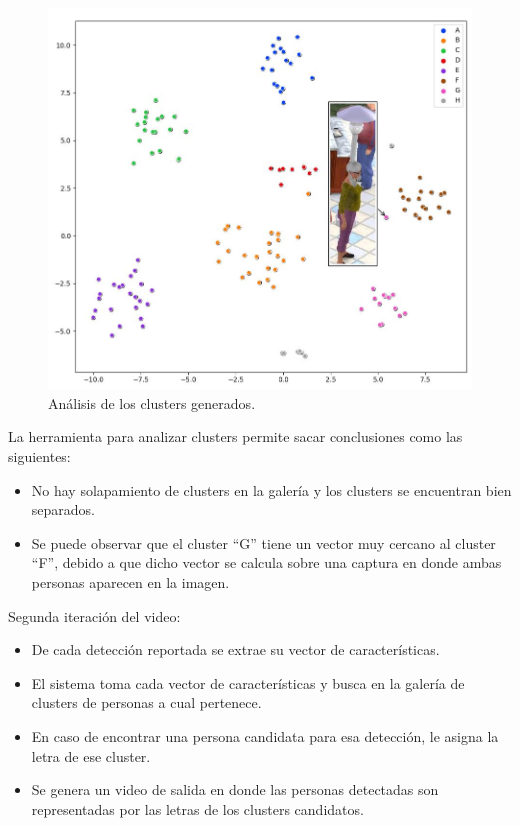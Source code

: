 \begin{figure}[ht]
	\centering
	\includegraphics[scale=.60]{./Figures/tsneClusers.jpg}
	\caption{Análisis de los clusters generados.}
	\label{fig:tsneClusers}
\end{figure}

La herramienta para analizar clusters permite sacar conclusiones como las siguientes:
\begin{itemize}
\item No hay solapamiento de clusters en la galería y los clusters se encuentran bien separados.
\item Se puede observar que el cluster ``G'' tiene un vector muy cercano al cluster ``F'', debido a que dicho vector se calcula sobre una captura en donde ambas personas aparecen en la imagen.
\end{itemize}

\newpage

Segunda iteración del video:
\begin{itemize}
\item De cada detección reportada se extrae su vector de características.
\item El sistema toma cada vector de características y busca en la galería de clusters de personas a cual pertenece.
\item En caso de encontrar una persona candidata para esa detección, le asigna la letra de ese cluster.
\item Se genera un video de salida en donde las personas detectadas son representadas por las letras de los clusters candidatos.
\end{itemize}

